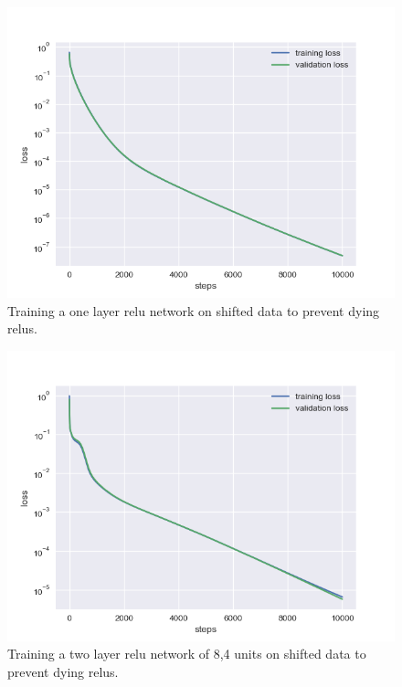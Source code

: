 \documentclass[a4paper]{article}
\begin{document}
\begin{figure}
\includegraphics[width=\linewidth]{../figures/relu_4.png}
\caption{Training a one layer relu network on shifted data to prevent dying relus.}
\label{fig:relu_hadamard_4}
\end{figure}

\begin{figure}
\includegraphics[width=\linewidth]{../figures/relu_8_4.png}
\caption{Training a two layer relu network of 8,4 units on shifted data to prevent dying relus.}
\label{fig:relu_hadamard_8_4}
\end{figure}
\end{document}

